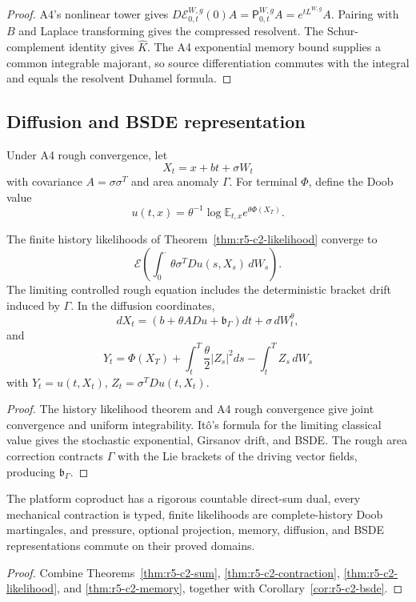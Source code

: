 \begin{proof}
A4's nonlinear tower gives
\(D{\mathcal E}^{W,g}_{0,t}(0)A
={\mathsf P}^{W,g}_{0,t}A=e^{tL^{W,g}}A\).
Pairing with \(B\) and Laplace transforming gives the compressed resolvent.
The Schur-complement identity gives \(\widehat K\).  The A4 exponential
memory bound supplies a common integrable majorant, so source differentiation
commutes with the integral and equals the resolvent Duhamel formula.
\end{proof}

\subsection{Diffusion and BSDE representation}

Under A4 rough convergence, let
\[
 X_t=x+bt+\sigma W_t
\]
with covariance \(A=\sigma\sigma^T\) and area anomaly \(\Gamma\).  For
terminal \(\Phi\), define the Doob value
\[
 u(t,x)=\theta^{-1}
 \log\mathbb E_{t,x}e^{\theta\Phi(X_T)}.
\]

\begin{corollary}
\label{cor:r5-c2-bsde}
The finite history likelihoods of
Theorem~\ref{thm:r5-c2-likelihood} converge to
\[
 {\mathcal E}\left(
 \int_0^\cdot\theta\sigma^TDu(s,X_s)\,dW_s\right).
\]
The limiting controlled rough equation includes the deterministic bracket
drift induced by \(\Gamma\).  In the diffusion coordinates,
\[
 dX_t=(b+\theta A Du+\mathfrak b_\Gamma)dt+\sigma\,dW_t^\theta,
\]
and
\[
 Y_t=\Phi(X_T)+\int_t^T\frac\theta2|Z_s|^2ds
       -\int_t^TZ_s\,dW_s
\]
with \(Y_t=u(t,X_t)\), \(Z_t=\sigma^TDu(t,X_t)\).
\end{corollary}

\begin{proof}
The history likelihood theorem and A4 rough convergence give joint
convergence and uniform integrability.  It\^o's formula for the limiting
classical value gives the stochastic exponential, Girsanov drift, and BSDE.
The rough area correction contracts \(\Gamma\) with the Lie brackets of the
driving vector fields, producing \(\mathfrak b_\Gamma\).
\end{proof}

\begin{theorem}
\label{thm:r5-c2-main}
The platform coproduct has a rigorous countable direct-sum dual, every
mechanical contraction is typed, finite likelihoods are complete-history
Doob martingales, and pressure, optional projection, memory, diffusion, and
BSDE representations commute on their proved domains.
\end{theorem}

\begin{proof}
Combine Theorems~\ref{thm:r5-c2-sum},
\ref{thm:r5-c2-contraction}, \ref{thm:r5-c2-likelihood}, and
\ref{thm:r5-c2-memory}, together with
Corollary~\ref{cor:r5-c2-bsde}.
\end{proof}

